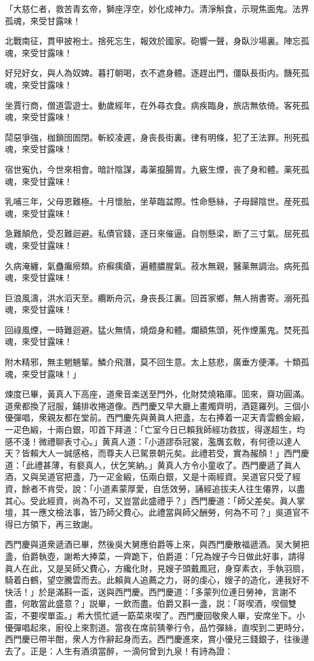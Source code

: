 \begin{myquote}
「大慈仁者，救苦青玄帝，獅座浮空，妙化成神力。清淨斛食，示現焦面鬼。法界孤魂，來受甘露味！　

北戰南征，貫甲披袍士。捨死忘生，報效於國家。砲響一聲，身臥沙場裏。陣忘孤魂，來受甘露味！

好兒好女，與人為奴婢。暮打朝喝，衣不遮身體。逐趕出門，僵臥長街内。饑死孤魂，來受甘露味！

坐賈行商，僧道雲遊士。動歲經年，在外尋衣食。病疾臨身，旅店無依倚。客死孤魂，來受甘露味！

鬦惡爭強，枷鎖囹圄閉。斬絞凌遲，身丧長街裏。律有明條，犯了王法罪。刑死孤魂，來受甘露味！

宿世寃仇，今世來相會。暗計陰謀，毒薬攛腸胃。九竅生煙，丧了身和體。薬死孤魂，來受甘露味！

乳哺三年，父母恩難極。十月懷胎，坐草臨盆際。性命懸絲，子母歸陰世。産死孤魂，來受甘露味！

急難顛危，受忍難迴避。私債官錢，逐日來催逼。自刎懸梁，断了三寸氣。屈死孤魂，來受甘露味！

久病淹纏，氣蠱癱癆類。疥癬痍瘡，遍體膿腥氣。菽水無親，醫薬無調治。病死孤魂，來受甘露味！

巨浪風濤，洪水滔天至。纜断舟沉，身丧長江裏。回首家鄉，無人捎書寄。溺死孤魂，來受甘露味！

回祿風煙，一時難迴避。猛火無情，燒燬身和體。爛額焦頭，死作煙薰鬼。焚死孤魂，來受甘露味！

附木精邪，無主魍魎輩。鱗介飛潛，莫不回生意。太上慈悲，廣垂方便澤。十類孤魂，來受甘露味！」
\end{myquote}

煉度已畢，黃真人下高座，道衆音楽送至門外，化財焚燒箱庫。囬來，齋功圓滿。道衆都換了冠服，鋪排收捲道像。西門慶又早大廳上畫燭齊明，酒筵羅列。三個小優彈唱，衆親友都在堂前。西門慶先與黄眞人把盞，左右捧着一疋天青雲鶴金緞，一疋色緞，十兩白銀，叩首下拜道：「亡室今日已賴我師經功救拔，得遂超生，均感不淺！微禮聊表寸心。」黄真人道：「小道謬忝冠裳，濫膺玄敎，有何德以達人天？皆賴大人一誠感格，而尊夫人已駕景朝元矣。此禮若受，實為赧顏！」西門慶道：「此禮甚薄，有褻真人，伏乞笑納。」黄真人方令小童收了。西門慶遞了眞人酒，又與吴道官把盞，乃一疋金緞，伍兩白銀，又是十兩經資。吴道官只受了經資，餘者不肯受，說：「小道素蒙厚愛，自恁效勞，誦經追拔夫人往生僊界，以盡其心。受此經資，尚為不可，又豈當此盛禮乎？」西門慶道：「師父差矣。眞人掌壇，其一應文檢法事，皆乃師父費心。此禮當與師父酬勞，何為不可？」吳道官不得已方領下，再三致謝。

西門慶與道衆遞酒已畢，然後吳大舅應伯爵等上來，與西門慶散福遞酒。吴大舅把盞，伯爵執壺，謝希大捧菜，一齊跪下，伯爵道：「兄為嫂子今日做此好事，請得眞人在此，又是吴師父費心，方纔化財，見嫂子頭戴鳳冠，身穿素衣，手執羽扇，騎着白鶴，望空騰雲而去。此賴眞人追薦之力，哥的虔心，嫂子的造化，連我好不快活！」於是滿斟一盃，送與西門慶。西門慶道：「多蒙列位連日勞神，言謝不盡，何敢當此盛意？」説畢，一飲而盡。伯爵又斟一盞，説：「哥喫酒，喫個雙盃，不要喫單盃。」希大慌忙遞一筯菜來喫了。西門慶回敬衆人畢，安席坐下。小優彈唱起來，廚役上來割道。當夜在席前猜拳行令，品竹彈絲，直喫到二更時分，西門慶已帶半酣，衆人方作辭起身而去。西門慶進來，賞小優兒三錢銀子，往後邊去了。正是：人生有酒須當醉，一滴何曾到九泉！有詩為證：

